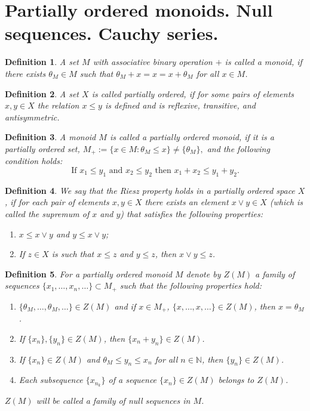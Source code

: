 \documentclass[12pt]{amsart}          %
\newtheorem{definition}{Definition}
\newcommand{\NN}{\mathbb N}
\begin{document}
\section{Partially ordered monoids. Null sequences. Cauchy series.}\label{s::MDistanceSpaces}
\begin{definition}
A set $M$ with associative binary operation $+$ is called a monoid, if there exists  $\theta_M\in M$ such that $\theta_M+x=x=x+\theta_M$ for all $x\in M$.

\end{definition}


\begin{definition}
A set $X$ is called partially ordered, if for some pairs of elements $x,y\in X$ the relation $x\le y$  is defined and is reflexive, transitive, and antisymmetric.
\end{definition}

\begin{definition}
{A monoid $M$ is called a partially ordered monoid, if it is a partially ordered set,} $M_+:=\{ x\in M\colon \theta_M\le x\}\neq \{\theta_M\},$ and the following condition holds: 
$$
    \text{If } x_1\leq y_1 \text{ and } x_2\leq y_2 \text{ then } x_1+x_2\leq y_1+y_2.
$$
\end{definition}

\begin{definition}
We say that the Riesz property holds in a partially ordered space $X$, if for each pair of elements $x,y\in X$  there exists an element $x\vee y\in X$ (which is called the supremum of $x$ and $y$) that satisfies the following properties:
\begin{enumerate}
    \item $x\leq x\vee y$ and $y\leq x\vee y$;
    \item If $z\in X$ is such that $x\leq z$ and $y\leq z$, then $x\vee y\leq z$.
\end{enumerate}
\end{definition}

\begin{definition}
For a partially ordered monoid $M$ denote by $Z(M)$ a family of sequences 
$
\{x_1,\ldots, x_n,\ldots\}\subset M_+
$
such that the following properties hold:
\begin{enumerate}
 \item $\{\theta_M,\ldots, \theta_M,\ldots\}\in Z(M)$ and if $x\in M_+$, $\{x,\ldots, x,\ldots\}\in Z(M)$, then $x=\theta_M$.
    \item If $\{x_n\}, \{y_n\}\in Z(M)$, then $\{x_n+y_n\}\in Z(M)$.
    \item If $\{x_n\}\in Z(M)$ and $\theta_M\leq y_n\leq x_n$ for all $n\in \NN$, then $\{y_n\}\in Z(M)$.
     \item Each subsequence $\{x_{n_k}\}$ of a sequence $\{x_n\}\in Z(M)$ belongs to $Z(M)$.
\end{enumerate}
$Z(M)$ will be called a family of null sequences in $M$.
\end{definition}
\end{document}
